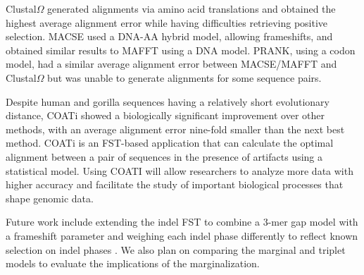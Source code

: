 Clustal$\Omega$ generated alignments via amino acid translations and obtained the highest average alignment error while having difficulties retrieving positive selection.
MACSE used a DNA-AA hybrid model, allowing frameshifts, and obtained similar results to MAFFT using a DNA model.
PRANK, using a codon model, had a similar average alignment error between MACSE/MAFFT and Clustal$\Omega$ but was unable to generate alignments for some sequence pairs.

Despite human and gorilla sequences having a relatively short evolutionary distance, COATi showed a biologically significant improvement over other methods, with an average alignment error nine-fold smaller than the next best method.
COATi is an FST-based application that can calculate the optimal alignment
between a pair of sequences in the presence of artifacts using a statistical
model.
Using COATI will allow researchers to analyze more data with higher accuracy and facilitate the study of important biological processes that shape genomic data.

Future work include extending the indel FST to combine a 3-mer gap model with a frameshift parameter and weighing each indel phase differently to reflect known selection on indel phases .
We also plan on comparing the marginal and triplet models to evaluate the implications of the marginalization.
